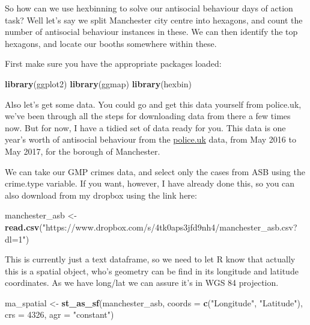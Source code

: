 \documentclass[]{book}
\newenvironment{Shaded}{\begin{snugshade}}{\end{snugshade}}
\newcommand{\DataTypeTok}[1]{\textcolor[rgb]{0.13,0.29,0.53}{#1}}
\newcommand{\DecValTok}[1]{\textcolor[rgb]{0.00,0.00,0.81}{#1}}
\newcommand{\KeywordTok}[1]{\textcolor[rgb]{0.13,0.29,0.53}{\textbf{#1}}}
\newcommand{\NormalTok}[1]{#1}
\newcommand{\StringTok}[1]{\textcolor[rgb]{0.31,0.60,0.02}{#1}}
\begin{document}
So how can we use hexbinning to solve our antisocial behaviour days of action task? Well let's say we split Manchester city centre into hexagons, and count the number of antisocial behaviour instances in these. We can then identify the top hexagons, and locate our booths somewhere within these.

First make sure you have the appropriate packages loaded:

\begin{Shaded}
\begin{Highlighting}[]
\KeywordTok{library}\NormalTok{(ggplot2)}
\KeywordTok{library}\NormalTok{(ggmap)}
\KeywordTok{library}\NormalTok{(hexbin)}
\end{Highlighting}
\end{Shaded}

Also let's get some data. You could go and get this data yourself from police.uk, we've been through all the steps for downloading data from there a few times now. But for now, I have a tidied set of data ready for you. This data is one year's worth of antisocial behaviour from the \href{data.police.uk}{police.uk} data, from May 2016 to May 2017, for the borough of Manchester.

We can take our GMP crimes data, and select only the cases from ASB using the crime.type variable. If you want, however, I have already done this, so you can also download from my dropbox using the link here:

\begin{Shaded}
\begin{Highlighting}[]
\NormalTok{manchester_asb <-}\StringTok{ }\KeywordTok{read.csv}\NormalTok{(}\StringTok{"https://www.dropbox.com/s/4tk0aps3jfd9nh4/manchester_asb.csv?dl=1"}\NormalTok{)}
\end{Highlighting}
\end{Shaded}

This is currently just a text dataframe, so we need to let R know that actually this is a spatial object, who's geometry can be find in its longitude and latitude coordinates. As we have long/lat we can assure it's in WGS 84 projection.

\begin{Shaded}
\begin{Highlighting}[]
\NormalTok{ma_spatial <-}\StringTok{ }\KeywordTok{st_as_sf}\NormalTok{(manchester_asb, }\DataTypeTok{coords =} \KeywordTok{c}\NormalTok{(}\StringTok{"Longitude"}\NormalTok{, }\StringTok{"Latitude"}\NormalTok{), }
                 \DataTypeTok{crs =} \DecValTok{4326}\NormalTok{, }\DataTypeTok{agr =} \StringTok{"constant"}\NormalTok{)}
\end{Highlighting}
\end{Shaded}
\end{document}

